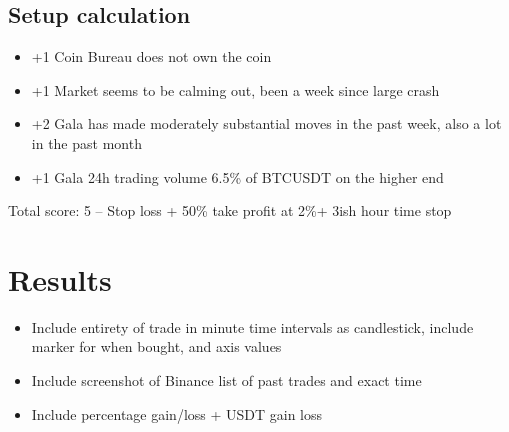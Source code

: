 \documentclass{trade}
\begin{document}
\subsection{Setup calculation}
\begin{itemize}
    \item +1 Coin Bureau does not own the coin
    \item +1 Market seems to be calming out, been a week since large crash
    \item +2 Gala has made moderately substantial moves in the past week, also a lot in the past month
    \item +1 Gala 24h trading volume 6.5\% of BTCUSDT on the higher end
\end{itemize}
Total score: 5 -- Stop loss + 50\% take profit at 2\%+ 3ish hour time stop

\section{Results}
\begin{itemize}
    \item Include entirety of trade in minute time intervals as candlestick, include marker for when bought, and axis values
    \item Include screenshot of Binance list of past trades and exact time
    \item Include percentage gain/loss + USDT gain loss
\end{itemize}
\end{document}
